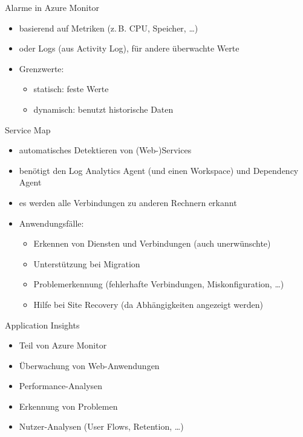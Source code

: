 \begin{flashcard}[Definition]{Alarme in Azure Monitor}
  \begin{itemize}
    \item basierend auf Metriken (z.\,B. CPU, Speicher, \ldots)
    \item oder Logs (aus Activity Log), für andere überwachte Werte
    \item Grenzwerte:
      \begin{itemize}
        \item statisch: feste Werte
        \item dynamisch: benutzt historische Daten
      \end{itemize}
  \end{itemize}
\end{flashcard}

\begin{flashcard}[]{Service Map}
  \begin{itemize}
    \item automatisches Detektieren von (Web-)Services
    \item benötigt den Log Analytics Agent (und einen Workspace) und Dependency Agent
    \item es werden alle Verbindungen zu anderen Rechnern erkannt
    \item Anwendungsfälle:
      \begin{itemize}
        \item Erkennen von Diensten und Verbindungen (auch unerwünschte)
        \item Unterstützung bei Migration
        \item Problemerkennung (fehlerhafte Verbindungen, Miskonfiguration, \ldots)
        \item Hilfe bei Site Recovery (da Abhängigkeiten angezeigt werden)
      \end{itemize}
  \end{itemize}
\end{flashcard}

\begin{flashcard}[]{Application Insights}
  \begin{itemize}
    \item Teil von Azure Monitor
    \item Überwachung von Web-Anwendungen
    \item Performance-Analysen
    \item Erkennung von Problemen
    \item Nutzer-Analysen (User Flows, Retention, \ldots)
  \end{itemize}
\end{flashcard}

